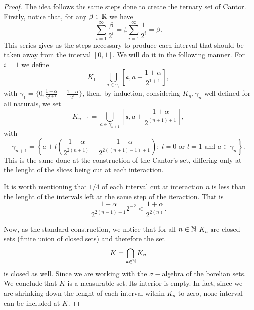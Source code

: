 \documentclass[11pt,a4paper]{article}
\begin{document}
\begin{proof}
   The idea follows the same steps done to create the ternary set of Cantor.
   Firstly, notice that, for any $\beta \in \operatorname{\mathbb{R}}$ we have
   \begin{equation*}
    \sum_{i=1}^{\infty} \frac{\beta}{2^i}
    =
    \beta \sum_{i=1}^{\infty} \frac{1}{2^i}
    =
    \beta. 
   \end{equation*}
   This series gives us the steps necessary to produce each interval that
   should be taken away from the interval $[0,1]$. We will do it in the 
   following manner. For $i=1$ we define  
   \begin{equation*}
    K_1 = \bigcup_{a \in \gamma_1} \left[a, a+ \frac{1+\alpha}{2^{1+1}}\right],
   \end{equation*}
   with $\gamma_1 = \{0, \frac{1+\alpha}{2^{1+1}} + \frac{1-\alpha}{2^{1}}\}$,
   then, by induction, considering $K_n, \gamma_n$ well defined for all
   naturals, we set
   \begin{equation*}
    K_{n+1}= \bigcup_{a \in \gamma_{n+1}}
        \left[a, a+ \frac{1+\alpha}{2^{(n+1)+1}}\right],
   \end{equation*}
   with
   \begin{equation*}
    \gamma_{n+1} = 
    \left\{
        a + l(\frac{1+\alpha}{2^{2(n+1)}} + \frac{1-\alpha}{2^{2((n+1)-1)+1}});
        \; l = 0 \text{ or } l = 1 \text{ and } a \in \gamma_n 
    \right\}.
   \end{equation*}
    This is the same done at the construction of the Cantor's set, 
    differing only at the lenght of the slices being cut at each
    interaction. 

    It is worth mentioning that $1/4$ of each interval cut at interaction
    $n$  is less than the lenght of the intervals left at the same step
    of the iteraction. That is
    \begin{equation*}
        \frac{1-\alpha}{2^{2(n-1)+1}} 2^{-2} < 
        \frac{1+\alpha}{2^{2(n)}}.
    \end{equation*}

    Now, as the standard construction, we notice that for all 
    $n \in \operatorname{\mathbb{N}}$  $K_n$ are closed sets (finite union of closed sets)
    and therefore the set
    \begin{equation*}
        K = \bigcap_{n \in \operatorname{\mathbb{N}}} K_n
    \end{equation*}
    is closed as well. Since we are working with the $\sigma-$algebra
    of the borelian sets. We conclude that $K$ is a measurable set.
    Its interior is empty. In fact, since we are shrinking down the
    lenght of each interval within $K_n$  to zero, none interval can
    be included at $K$.  
    

\end{proof}
\end{document}
